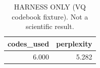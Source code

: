 \begin{table}[t]
\centering
\caption{HARNESS ONLY (VQ codebook fixture). Not a scientific result.}
\label{tab:codebook}
\begin{tabular}{rr}
\toprule
codes\_used & perplexity \\
\midrule
6.000 & 5.282 \\
\bottomrule
\end{tabular}
\end{table}
